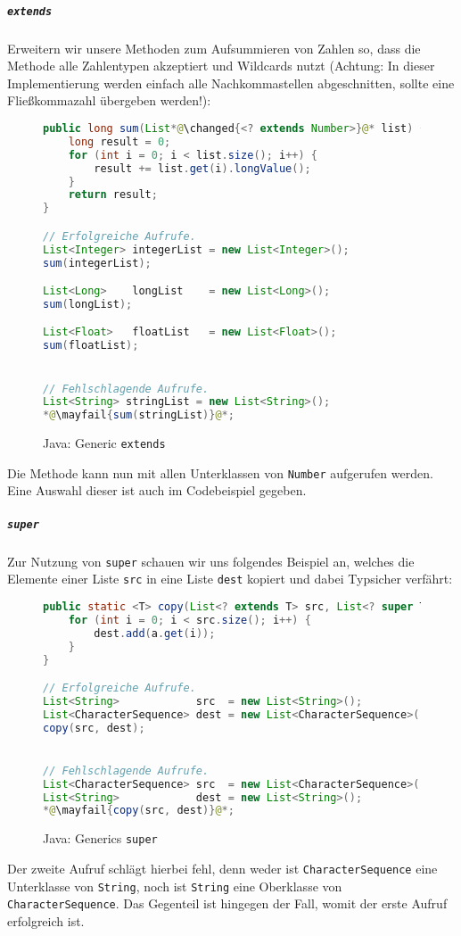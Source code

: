			\subparagraph{\texttt{extends}}
				Erweitern wir unsere Methoden zum Aufsummieren von Zahlen so, dass die Methode alle Zahlentypen akzeptiert und Wildcards nutzt (Achtung: In dieser Implementierung werden einfach alle Nachkommastellen abgeschnitten, sollte eine Fließkommazahl übergeben werden!):
				\begin{figure}[H]
					\centering
					\begin{lstlisting}[language = Java]
public long sum(List*@\changed{<? extends Number>}@* list) {
	long result = 0;
	for (int i = 0; i < list.size(); i++) {
		result += list.get(i).longValue();
	}
	return result;
}

// Erfolgreiche Aufrufe.
List<Integer> integerList = new List<Integer>();
sum(integerList);

List<Long>    longList    = new List<Long>();
sum(longList);

List<Float>   floatList   = new List<Float>();
sum(floatList);


// Fehlschlagende Aufrufe.
List<String> stringList = new List<String>();
*@\mayfail{sum(stringList)}@*;
					\end{lstlisting}
					\caption{Java: Generic \texttt{extends}}
				\end{figure}
				Die Methode kann nun mit allen Unterklassen von \texttt{Number} aufgerufen werden. Eine Auswahl dieser ist auch im Codebeispiel gegeben.
			
			\subparagraph{\texttt{super}}
				Zur Nutzung von \texttt{super} schauen wir uns folgendes Beispiel an, welches die Elemente einer Liste \texttt{src} in eine Liste \texttt{dest} kopiert und dabei Typsicher verfährt:
				\begin{figure}[H]
					\centering
					\begin{lstlisting}[language = Java]
public static <T> copy(List<? extends T> src, List<? super T> dest) {
	for (int i = 0; i < src.size(); i++) {
		dest.add(a.get(i));
	}
}

// Erfolgreiche Aufrufe.
List<String>            src  = new List<String>();
List<CharacterSequence> dest = new List<CharacterSequence>();
copy(src, dest);


// Fehlschlagende Aufrufe.
List<CharacterSequence> src  = new List<CharacterSequence>();
List<String>            dest = new List<String>();
*@\mayfail{copy(src, dest)}@*;
					\end{lstlisting}
					\caption{Java: Generics \texttt{super}}
				\end{figure}
				Der zweite Aufruf schlägt hierbei fehl, denn weder ist \texttt{CharacterSequence} eine Unterklasse von \texttt{String}, noch ist \texttt{String} eine Oberklasse von \texttt{CharacterSequence}. Das Gegenteil ist hingegen der Fall, womit der erste Aufruf erfolgreich ist.
			
